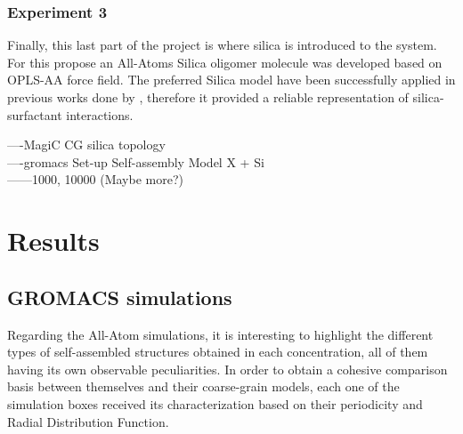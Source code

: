 \documentclass[10pt,a4paper,twoside]{article}
\begin{document}
\subsubsection*{Experiment 3}

Finally, this last part of the project is where silica is introduced to the system. For this propose an All-Atoms Silica oligomer molecule was developed based on OPLS-AA force field. The preferred Silica model have been successfully applied in previous works done by \cite{mjsilica}, therefore it provided a reliable representation of silica-surfactant interactions.
   
  ----MagiC CG silica topology \\
  ----gromacs Set-up Self-assembly Model X + Si\\
   ------1000, 10000 (Maybe more?)
 
\section{Results}
\subsection{GROMACS simulations}
Regarding the All-Atom simulations, it is interesting to highlight the different types of self-assembled  structures obtained in each concentration, all of them having its own observable peculiarities. In order to obtain a cohesive comparison basis between themselves and their coarse-grain models, each one of the simulation boxes received its characterization based on their periodicity and Radial Distribution Function.
\end{document}
